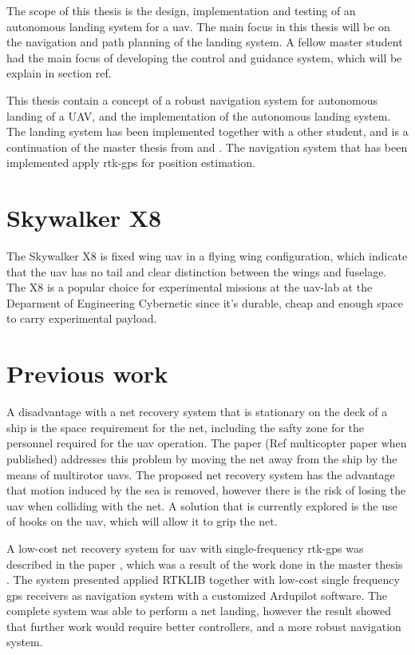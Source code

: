 The scope of this thesis is the design, implementation and testing of an autonomous landing system for a uav. The main focus in this thesis will be on the navigation and path planning of the landing system. A fellow master student had the main focus of developing the control and guidance system, which will be explain in section ref.


This thesis contain a concept of a robust navigation system for autonomous landing of a UAV, and the implementation of the autonomous landing system. The landing system has been implemented together with a other student, and is a continuation of the master thesis from \citep{Froelich} and \citep{Skulstad&Syversen}. The navigation system that has been implemented apply rtk-gps for position estimation.
\section{Skywalker X8}
The Skywalker X8 is fixed wing \gls{uav} in a flying wing configuration, which indicate that the \gls{uav} has no tail and clear distinction between the wings and fuselage. The X8 is a popular choice for experimental missions at the \gls{uav}-lab at the Deparment of Engineering Cybernetic since it's durable, cheap and enough space to carry experimental payload.
\section{Previous work}
A disadvantage with a net recovery system that is stationary on the deck of a ship is the space requirement for the net, including the safty zone for the personnel required for the uav operation. The paper (Ref multicopter paper when published) addresses this problem by moving the net away from the ship by the means of multirotor uavs. The proposed net recovery system has the advantage that motion induced by the sea is removed, however there is the risk of losing the uav when colliding with the net. A solution that is currently explored is the use of hooks on the uav, which will allow it to grip the net.

A low-cost net recovery system for \gls{uav} with single-frequency \gls{rtk-gps} was described in the paper \citep{skulstad2015net}, which was a result of the work done in the master thesis \citep{Skulstad&Syversen}. The system presented applied RTKLIB together with low-cost single frequency \gls{gps} receivers as navigation system with a customized Ardupilot software. The complete system was able to perform a net landing, however the result showed that further work would require better controllers, and a more robust navigation system.

